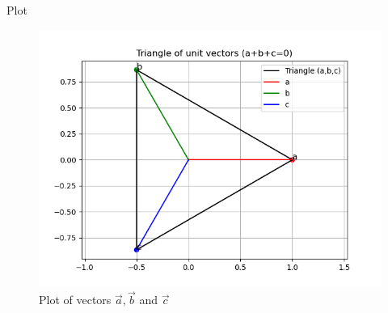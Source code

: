 \documentclass{beamer}
\begin{document}
\begin{frame}{Plot}
    \begin{figure}
        \centering
        \includegraphics[width=0.5\columnwidth]{../figs/plot.png}
        \caption{Plot of vectors $\vec{a}, \vec{b}$ and $\vec{c}$}
        \label{fig:fig}
    \end{figure}
\end{frame}
\end{document}
